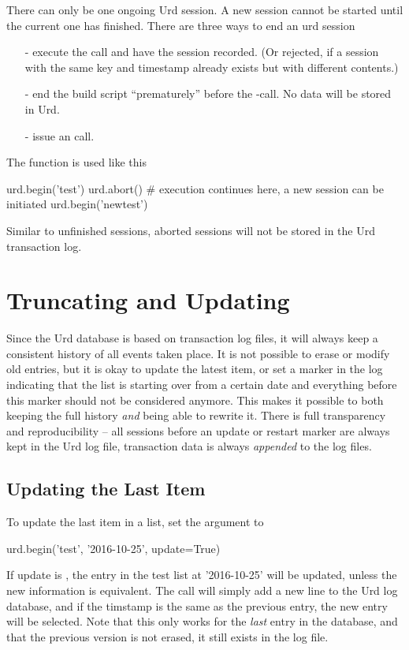 There can only be one ongoing Urd session.  A new session cannot be
started until the current one has finished.  There are three ways to
end an urd session
\begin{itemize}
\item[-] execute the  call and have the session recorded.
(Or rejected, if a session with the same key and timestamp already
exists but with different contents.)
\item[-] end the build script ``prematurely'' before the
-call.  No data will be stored in Urd.
\item[-] issue an  call.
\end{itemize}
The  function is used like this
\begin{python}
urd.begin('test')
urd.abort()
# execution continues here, a new session can be initiated
urd.begin('newtest')
\end{python}
Similar to unfinished sessions, aborted sessions will not be stored in
the Urd transaction log.





\section{Truncating and Updating}
\label{sec:trunc-update}
Since the Urd database is based on transaction log files, it will
always keep a consistent history of all events taken place.  It is not
possible to erase or modify old entries, but it is okay to update the
latest item, or set a marker in the log indicating that the list is
starting over from a certain date and everything before this marker
should not be considered anymore.  This makes it possible to both
keeping the full history \textsl{and} being able to rewrite it.  There
is full transparency and reproducibility -- all sessions before an
update or restart marker are always kept in the Urd log file,
transaction data is always \textsl{appended} to the log files.



\subsection{Updating the Last Item}
To update the last item in a list, set the  argument
to \pyTrue
\begin{python}
urd.begin('test', '2016-10-25', update=True)
\end{python}
If update is \pyTrue, the entry in the test list at '2016-10-25' will
be updated, unless the new information is equivalent.
The  call will simply add a new line to the Urd log
database, and if the timstamp is the same as the previous entry, the
new entry will be selected.  Note that this only works for
the \textsl{last} entry in the database, and that the previous version
is not erased, it still exists in the log file.



